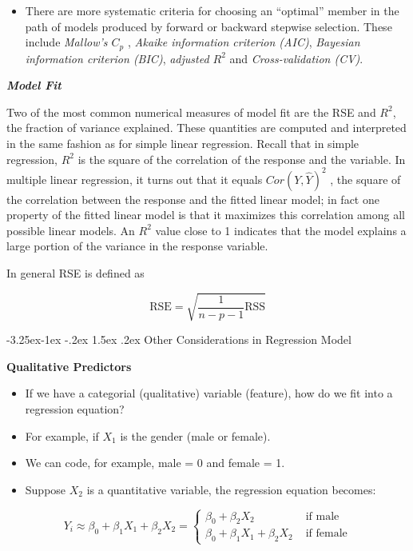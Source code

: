 \documentclass[]{book}
\makeatletter
\providecommand{\tightlist}{%
  \setlength{\itemsep}{0pt}\setlength{\parskip}{0pt}}
\newenvironment{rmdblock}[1]
  {\begin{shaded*}
  \begin{itemize}
  \renewcommand{\labelitemi}{
    \raisebox{-.7\height}[0pt][0pt]{
      {\setkeys{Gin}{width=2em,keepaspectratio}\texttt{[image: img/icons/\#1]}}
    }
  }
  \item
  }
  {
  \end{itemize}
  \end{shaded*}
  }
\newenvironment{rmdinsight}
  {\begin{rmdblock}{insight}}
  {\end{rmdblock}}
\renewcommand\subsection{\@startsection{subsection}{2}{\z@}%
                                     {-3.25ex\@plus -1ex \@minus -.2ex}%
                                     {1.5ex \@plus .2ex}%
                                     {\normalfont\large\bfseries\color{Violet}}}
\theoremstyle{definition}
\theoremstyle{definition}
\theoremstyle{definition}
\theoremstyle{remark}
\makeatother
\begin{document}
\begin{rmdinsight}
There are more systematic criteria for choosing an ``optimal'' member in
the path of models produced by forward or backward stepwise selection.
These include \emph{Mallow's \(C_p\)} , \emph{Akaike information
criterion (AIC)}, \emph{Bayesian information criterion (BIC)},
\emph{adjusted \(R^2\)} and \emph{Cross-validation (CV)}.
\end{rmdinsight}

\textbf{\emph{Model Fit}}

Two of the most common numerical measures of model fit are the RSE and
\(R^2\), the fraction of variance explained. These quantities are
computed and interpreted in the same fashion as for simple linear
regression. Recall that in simple regression, \(R^2\) is the square of
the correlation of the response and the variable. In multiple linear
regression, it turns out that it equals \(Cor(Y, \hat{Y})^2\) , the
square of the correlation between the response and the fitted linear
model; in fact one property of the fitted linear model is that it
maximizes this correlation among all possible linear models. An \(R^2\)
value close to 1 indicates that the model explains a large portion of
the variance in the response variable.

In general RSE is defined as

\[ \text{RSE} = \sqrt{\frac{1}{n-p-1}\text{RSS}} \]

\subsection{Other Considerations in Regression
Model}\label{other-consid}

\textbf{Qualitative Predictors}

\begin{itemize}
\tightlist
\item
  If we have a categorial (qualitative) variable (feature), how do we
  fit into a regression equation?
\item
  For example, if \(X_1\) is the gender (male or female).
\item
  We can code, for example, male = 0 and female = 1.
\item
  Suppose \(X_2\) is a quantitative variable, the regression equation
  becomes:
\end{itemize}

\[ Y_i \approx \beta_0 + \beta_1 X_1 + \beta_2 X_2 = \begin{cases}
  \beta_0 + \beta_2 X_2 & \text{ if male} \\
  \beta_0 + \beta_1 X_1 + \beta_2 X_2 & \text{ if female}
\end{cases} \]
\end{document}
